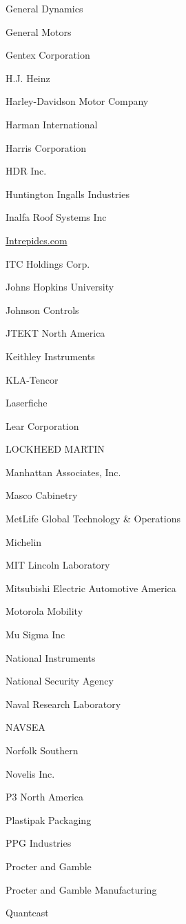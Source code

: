 \documentclass[twoside]{article}
\begin{document}
\begin{center}
\begin{multicols}{5}
\begin{FlushLeft}
\begin{compactitem}
\item General Dynamics
\item General Motors
\item Gentex Corporation
\item H.J. Heinz
\item Harley-Davidson Motor Company
\item Harman International
\item Harris Corporation
\item HDR Inc.
\item Huntington Ingalls Industries
\item Inalfa Roof Systems Inc
\item \url{Intrepidcs.com}
\item ITC Holdings Corp.
\item Johns Hopkins University
\item Johnson Controls
\item JTEKT North America
\item Keithley Instruments
\item KLA-Tencor
\item Laserfiche
\item Lear Corporation
\item LOCKHEED MARTIN
\item Manhattan Associates, Inc.
\item Masco Cabinetry
\item MetLife Global Technology \& Operations
\item Michelin
\item MIT Lincoln Laboratory
\item Mitsubishi Electric Automotive America
\item Motorola Mobility
\item Mu Sigma Inc
\item National Instruments
\item National Security Agency
\item Naval Research Laboratory
\item NAVSEA
\item Norfolk Southern
\item Novelis Inc.
\item P3 North America
\item Plastipak Packaging
\item PPG Industries
\item Procter and Gamble
\item Procter and Gamble Manufacturing
\item Quantcast

\end{compactitem}
\end{FlushLeft}
\end{multicols}
\end{center}
\end{document}
